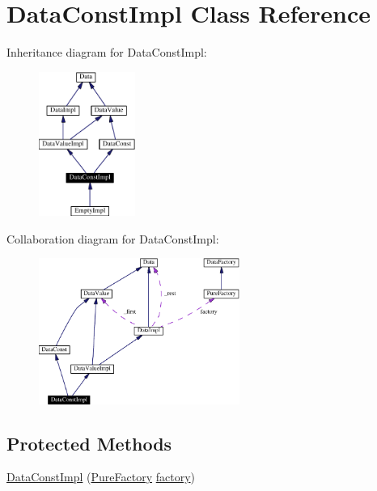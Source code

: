 \hypertarget{classDataConstImpl}{
\section{Data\-Const\-Impl  Class Reference}
\label{classDataConstImpl}
}
Inheritance diagram for Data\-Const\-Impl:\begin{figure}[H]
\begin{center}
\leavevmode
\includegraphics[width=89pt]{classDataConstImpl__inherit__graph}
\end{center}
\end{figure}
Collaboration diagram for Data\-Const\-Impl:\begin{figure}[H]
\begin{center}
\leavevmode
\includegraphics[width=186pt]{classDataConstImpl__coll__graph}
\end{center}
\end{figure}
\subsection*{Protected Methods}
\begin{CompactItemize}
\item 
\hyperlink{classDataConstImpl_b0}{Data\-Const\-Impl} (\hyperlink{classPureFactory}{Pure\-Factory} \hyperlink{classDataImpl_o0}{factory})
\end{CompactItemize}


